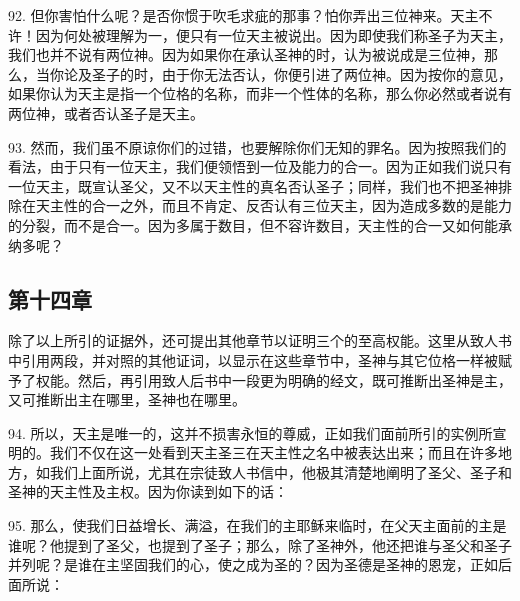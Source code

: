 92. 但你害怕什么呢？是否你惯于吹毛求疵的那事？怕你弄出三位神来。天主不许！因为何处被理解为一，便只有一位天主被说出。因为即使我们称圣子为天主，我们也并不说有两位神。因为如果你在承认圣神的时，认为被说成是三位神，那么，当你论及圣子的时，由于你无法否认，你便引进了两位神。因为按你的意见，如果你认为天主是指一个位格的名称，而非一个性体的名称，那么你必然或者说有两位神，或者否认圣子是天主。\par

93. 然而，我们虽不原谅你们的过错，也要解除你们无知的罪名。因为按照我们的看法，由于只有一位天主，我们便领悟到一位及能力的合一。因为正如我们说只有一位天主，既宣认圣父，又不以天主性的真名否认圣子；同样，我们也不把圣神排除在天主性的合一之外，而且不肯定、反否认有三位天主，因为造成多数的是能力的分裂，而不是合一。因为多属于数目，但不容许数目，天主性的合一又如何能承纳多呢？\par


\subsection{第十四章}

除了以上所引的证据外，还可提出其他章节以证明三个的至高权能。这里从致人书中引用两段，并对照的其他证词，以显示在这些章节中，圣神与其它位格一样被赋予了权能。然后，再引用致人后书中一段更为明确的经文，既可推断出圣神是主，又可推断出主在哪里，圣神也在哪里。\par

94. 所以，天主是唯一的，这并不损害永恒的尊威，正如我们面前所引的实例所宣明的。我们不仅在这一处看到天主圣三在天主性之名中被表达出来；而且在许多地方，如我们上面所说，尤其在宗徒致人书信中，他极其清楚地阐明了圣父、圣子和圣神的天主性及主权。因为你读到如下的话：\par

95. 那么，使我们日益增长、满溢，在我们的主耶稣来临时，在父天主面前的主是谁呢？他提到了圣父，也提到了圣子；那么，除了圣神外，他还把谁与圣父和圣子并列呢？是谁在主坚固我们的心，使之成为圣的？因为圣德是圣神的恩宠，正如后面所说：\par

